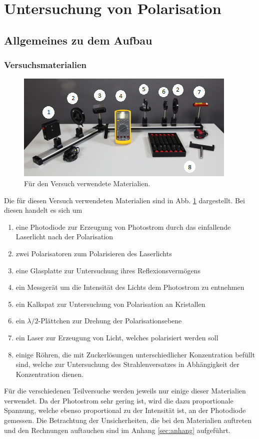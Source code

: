 \section{Untersuchung von Polarisation}

	\subsection{Allgemeines zu dem Aufbau}
	
		\subsubsection{Versuchsmaterialien}
		
			\begin{figure}[ht]
				\centering
				\includegraphics[width=\textwidth]{bilder/s_Materialien.png}
				\caption{Für den Versuch verwendete Materialien.\cite{WWU}}
				\label{fig:Materialien}	
			\end{figure}
			Die für diesen Versuch verwendeten Materialien sind in Abb. \ref{fig:Materialien} dargestellt.
			Bei diesen handelt es sich um
			\begin{enumerate}
				\item eine Photodiode zur Erzeugung von Photostrom durch das einfallende Laserlicht nach der Polarisation
				\item zwei Polarisatoren zum Polarisieren des Laserlichts
				\item eine Glasplatte zur Untersuchung ihres Reflexionsvermögens
				\item ein Messgerät um die Intensität des Lichts dem Photostrom zu entnehmen
				\item ein Kalkspat zur Untersuchung von Polarisation an Kristallen
				\item ein $\lambda/2$-Plättchen zur Drehung der Polarisationsebene
				\item ein Laser zur Erzeugung von Licht, welches polarisiert werden soll
				\item einige Röhren, die mit Zuckerlösungen unterschiedlicher Konzentration befüllt sind, welche zur Untersuchung des Strahlenversatzes in Abhängigkeit der Konzentration dienen.
			\end{enumerate} 
			Für die verschiedenen Teilversuche werden jeweils nur einige dieser Materialien verwendet.		
			Da der Photostrom sehr gering ist, wird die dazu proportionale Spannung, welche ebenso proportional zu der Intensität ist, an der Photodiode gemessen.
			Die Betrachtung der Unsicherheiten, die bei den Materialien auftreten und den Rechnungen auftauchen sind im Anhang \ref{sec:anhang} aufgeführt.
			
